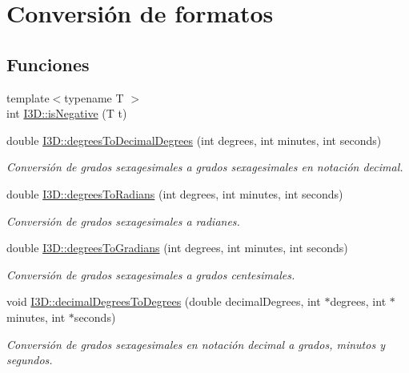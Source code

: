 \hypertarget{group__format_conversion}{}\section{Conversión de formatos}
\label{group__format_conversion}
\subsection*{Funciones}
\begin{DoxyCompactItemize}
\item 
{\footnotesize template$<$typename T $>$ }\\int \hyperlink{group__format_conversion_ga733eb2d043c69e2b8a0527622e38cfab}{I3\+D\+::is\+Negative} (T t)
\item 
double \hyperlink{group__format_conversion_ga6219d37cf7c1be1176f323bdf7982b2b}{I3\+D\+::degrees\+To\+Decimal\+Degrees} (int degrees, int minutes, int seconds)
\begin{DoxyCompactList}\small\item\em Conversión de grados sexagesimales a grados sexagesimales en notación decimal. \end{DoxyCompactList}\item 
double \hyperlink{group__format_conversion_gaedea9963e49e918a8fbfc75e0c1dfc7d}{I3\+D\+::degrees\+To\+Radians} (int degrees, int minutes, int seconds)
\begin{DoxyCompactList}\small\item\em Conversión de grados sexagesimales a radianes. \end{DoxyCompactList}\item 
double \hyperlink{group__format_conversion_gafe5e54462cbdb02cc83abd739f1f8e3b}{I3\+D\+::degrees\+To\+Gradians} (int degrees, int minutes, int seconds)
\begin{DoxyCompactList}\small\item\em Conversión de grados sexagesimales a grados centesimales. \end{DoxyCompactList}\item 
void \hyperlink{group__format_conversion_gac669f1ed12a67d5a4da09c1eb3feb9f6}{I3\+D\+::decimal\+Degrees\+To\+Degrees} (double decimal\+Degrees, int $\ast$degrees, int $\ast$minutes, int $\ast$seconds)
\begin{DoxyCompactList}\small\item\em Conversión de grados sexagesimales en notación decimal a grados, minutos y segundos. \end{DoxyCompactList}\item 

\end{DoxyCompactItemize}
